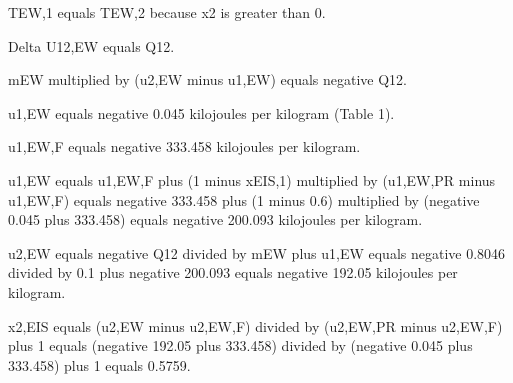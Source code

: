 TEW,1 equals TEW,2 because x2 is greater than 0.  

Delta U12,EW equals Q12.  

mEW multiplied by (u2,EW minus u1,EW) equals negative Q12.  

u1,EW equals negative 0.045 kilojoules per kilogram (Table 1).  

u1,EW,F equals negative 333.458 kilojoules per kilogram.  

u1,EW equals u1,EW,F plus (1 minus xEIS,1) multiplied by (u1,EW,PR minus u1,EW,F) equals negative 333.458 plus (1 minus 0.6) multiplied by (negative 0.045 plus 333.458) equals negative 200.093 kilojoules per kilogram.  

u2,EW equals negative Q12 divided by mEW plus u1,EW equals negative 0.8046 divided by 0.1 plus negative 200.093 equals negative 192.05 kilojoules per kilogram.  

x2,EIS equals (u2,EW minus u2,EW,F) divided by (u2,EW,PR minus u2,EW,F) plus 1 equals (negative 192.05 plus 333.458) divided by (negative 0.045 plus 333.458) plus 1 equals 0.5759.